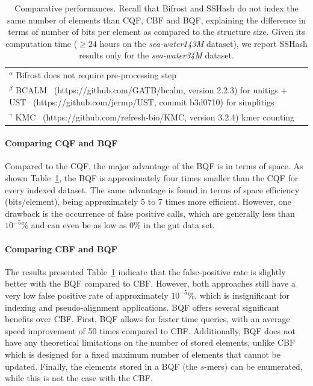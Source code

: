 \begin{table}[ht]
{\begin{tabular}{rr|rrrr|rrr}
    & &      &    &         &         &         &       \\ \hline
    \multicolumn{8}{l}{\footnotesize $^\alpha$ Bifrost does not require pre-processing step} \\ 
    \multicolumn{8}{l}{\footnotesize $^\beta$ BCALM~\cite{bcalm_2016} (https://github.com/GATB/bcalm, version 2.2.3) for unitigs + UST~\cite{RahmanMedvedevRECOMB20} (https://github.com/jermp/UST, commit b3d0710) for simplitigs} \\
    \multicolumn{8}{l}{\footnotesize $^\gamma$ KMC~\cite{kmc_2017} (https://github.com/refresh-bio/KMC, version 3.2.4) kmer counting}
\end{tabular} 
}
\caption{Comparative performances. Recall that Bifrost and SSHash do not index the same number of elements than CQF, CBF and BQF, explaining the difference in terms of number of bits per element as compared to the structure size. Given its computation time ($\geq 24$ hours on the \textit{sea-water143M} dataset), we report SSHash results only for the \textit{sea-water34M} dataset. }
\label{table:results}
\end{table}



\paragraph{Comparing CQF and BQF}
Compared to the CQF, the major advantage of the BQF is in terms of space. As shown Table~\ref{table:results}, the BQF is approximately four times smaller than the CQF for every indexed dataset. %
The same advantage is found in terms of space efficiency (bits/element), being approximately 5 to 7 times more efficient. However, one drawback is the occurrence of false positive calls, which are generally less than $10^{-5}\%$ and can even be as low as 0\% in the gut data set. 

\paragraph{Comparing CBF and BQF}
The results presented Table~\ref{table:results} indicate that the false-positive rate is slightly better with the BQF compared to CBF. However, both approaches still have a very low false positive rate of approximately $10^{-5}$\%, which is insignificant for indexing and pseudo-alignment applications. BQF offers several significant benefits over CBF. First, BQF allows for faster time queries, with an average speed improvement of 50 times compared to CBF. Additionally, BQF does not have any theoretical limitations on the number of stored elements, unlike CBF which is designed for a fixed maximum number of elements that cannot be updated. Finally, the elements stored in a BQF (the $s$-mers) can be enumerated, while this is not the case with the CBF.

